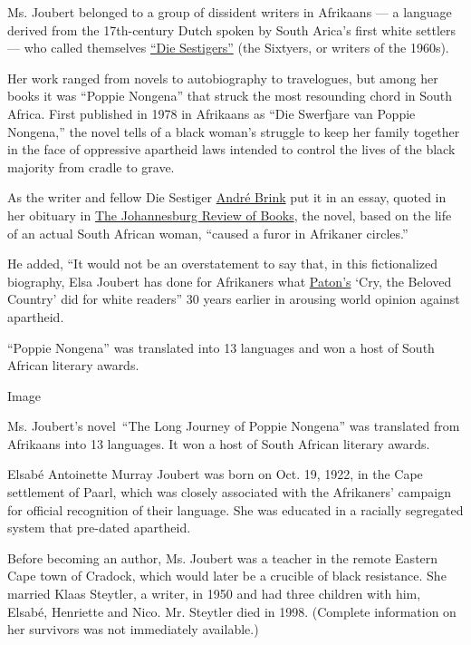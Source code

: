 Ms. Joubert belonged to a group of dissident writers in Afrikaans --- a
language derived from the 17th-century Dutch spoken by South Arica's
first white settlers --- who called themselves
\href{https://www.britannica.com/topic/Sestigers}{``Die Sestigers''}
(the Sixtyers, or writers of the 1960s).

Her work ranged from novels to autobiography to travelogues, but among
her books it was ``Poppie Nongena'' that struck the most resounding
chord in South Africa. First published in 1978 in Afrikaans as ``Die
Swerfjare van Poppie Nongena,'' the novel tells of a black woman's
struggle to keep her family together in the face of oppressive apartheid
laws intended to control the lives of the black majority from cradle to
grave.

As the writer and fellow Die Sestiger
\href{https://www.britannica.com/biography/Andre-Philippus-Brink\#ref113215}{André
Brink} put it in an essay, quoted in her obituary in
\href{https://johannesburgreviewofbooks.com/2020/06/15/elsa-joubert-1922-2020-rip/}{The
Johannesburg Review of Books}, the novel, based on the life of an actual
South African woman, ``caused a furor in Afrikaner circles.''

He added, ``It would not be an overstatement to say that, in this
fictionalized biography, Elsa Joubert has done for Afrikaners what
\href{https://www.nytimes.com/1988/04/13/obituaries/alan-paton-author-who-fought-against-apartheid-is-dead-at-85.html}{Paton's}
`Cry, the Beloved Country' did for white readers'' 30 years earlier in
arousing world opinion against apartheid.

``Poppie Nongena'' was translated into 13 languages and won a host of
South African literary awards.

Image

Ms. Joubert's novel~``The Long Journey of Poppie Nongena'' was
translated from Afrikaans into 13 languages. It won a host of South
African literary awards.

Elsabé Antoinette Murray Joubert was born on Oct. 19, 1922, in the Cape
settlement of Paarl, which was closely associated with the Afrikaners'
campaign for official recognition of their language. She was educated in
a racially segregated system that pre-dated apartheid.

Before becoming an author, Ms. Joubert was a teacher in the remote
Eastern Cape town of Cradock, which would later be a crucible of black
resistance. She married Klaas Steytler, a writer, in 1950 and had three
children with him, Elsabé, Henriette and Nico. Mr. Steytler died in
1998. (Complete information on her survivors was not immediately
available.)

